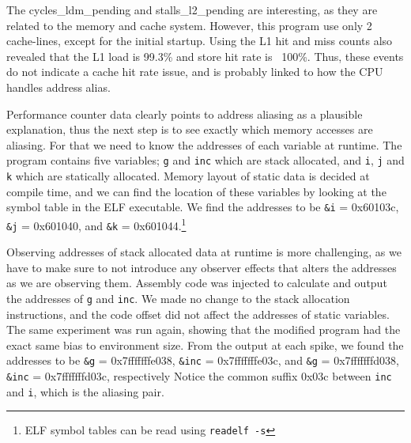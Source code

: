 \documentclass[prodmode,acmtaco]{acmsmall}
\begin{document}
The cycles\_ldm\_pending and stalls\_l2\_pending are interesting, as they are related to the memory and cache system.
However, this program use only 2 cache-lines, except for the initial startup.
Using the L1 hit and miss counts also revealed that the L1 load is 99.3\% and store hit rate is ~100\%.
Thus, these events do not indicate a cache hit rate issue, and is probably linked to how the CPU handles address alias.

Performance counter data clearly points to address aliasing as a plausible explanation, thus the next step is to see exactly which memory accesses are aliasing. 
For that we need to know the addresses of each variable at runtime.
The program contains five variables; \texttt{g} and \texttt{inc} which are stack allocated, and \texttt{i}, \texttt{j} and \texttt{k} which are statically allocated.
Memory layout of static data is decided at compile time, and we can find the location of these variables by looking at the symbol table in the ELF executable.
We find the addresses to be \texttt{\&i} = 0x60103c, \texttt{\&j} = 0x601040, and \texttt{\&k} = 0x601044.\footnote{ELF symbol tables can be read using \texttt{readelf -s}}

Observing addresses of stack allocated data at runtime is more challenging, as we have to make sure to not introduce any observer effects that alters the addresses as we are observing them.
Assembly code was injected to calculate and output the addresses of \texttt{g} and \texttt{inc}.
We made no change to the stack allocation instructions, and the code offset did not affect the addresses of static variables.
The same experiment was run again, showing that the modified program had the exact same bias to environment size.
From the output at each spike, we found the addresses to be \texttt{\&g} = 0x7fffffffe038, \texttt{\&inc} = 0x7fffffffe03c, and \texttt{\&g} = 0x7fffffffd038, \texttt{\&inc} = 0x7fffffffd03c, respectively
Notice the common suffix 0x03c between \texttt{inc} and \texttt{i}, which is the aliasing pair.


% 
\end{document}
